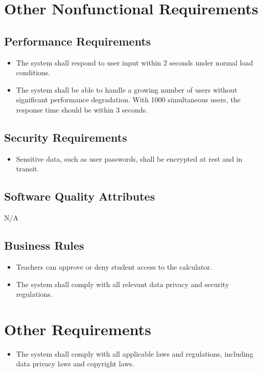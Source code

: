 \documentclass{scrreprt}
\begin{document}
\chapter{Other Nonfunctional Requirements}

\section{Performance Requirements}

\begin{itemize}
    \item The system shall respond to user input within 2 seconds under normal load conditions.
    \item The system shall be able to handle a growing number of users without significant performance degradation. With 1000 simultaneous users, the response time should be within 3 seconds.
\end{itemize}


\section{Security Requirements}
\begin{itemize}
    \item Sensitive data, such as user passwords, shall be encrypted at rest and in transit.
\end{itemize}

\section{Software Quality Attributes}
N/A

\section{Business Rules}
\begin{itemize}
    \item Teachers can approve or deny student access to the calculator.
    \item The system shall comply with all relevant data privacy and security regulations.
\end{itemize}


\chapter{Other Requirements}

\begin{itemize}
    \item The system shall comply with all applicable laws and regulations, including data privacy laws and copyright laws.
\end{itemize}
\end{document}
